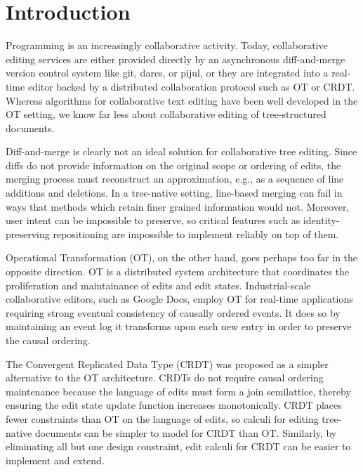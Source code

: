
\section{Introduction}%
\label{sec:Introduction}


Programming is an increasingly collaborative activity.
Today, collaborative editing services are either
provided directly by an asynchronous diff-and-merge version control system like git, darcs, or pijul,
or they are integrated into a real-time editor backed by a distributed collaboration protocol such as OT or CRDT.
Whereas algorithms for collaborative text editing have been well developed in the OT setting,
we know far less about collaborative editing of tree-structured documents.

Diff-and-merge is clearly not an ideal solution for collaborative tree editing.
Since diffs do not provide information on the original scope or ordering of edits,
the merging process must reconstruct an approximation, e.g., as a sequence of line additions and deletions.
In a tree-native setting, line-based merging can fail in ways that methods which retain finer grained information would not.
Moreover, user intent can be impossible to preserve,
so critical features such as identity-preserving repositioning are impossible to implement reliably on top of them.

Operational Transformation (OT), on the other hand, goes perhaps too far in the opposite direction.
OT is a distributed system architecture that coordinates the proliferation and maintainance of edits and edit states.
Industrial-scale collaborative editors, such as Google Docs,
employ OT for real-time applications requiring strong eventual consistency of causally ordered events.
It does so by maintaining an event log it transforms upon each new entry in order to preserve the causal ordering.

The Convergent Replicated Data Type (CRDT) was proposed as a simpler alternative to the OT architecture.
CRDTs do not require causal ordering maintenance because the language of edits must form a join semilattice,
thereby ensuring the edit state update function increases monotonically.
CRDT places fewer constraints than OT on the language of edits,
so calculi for editing tree-native documents can be simpler to model for CRDT than OT.
Similarly, by eliminating all but one design constraint, edit calculi for CRDT can be easier to implement and extend.

